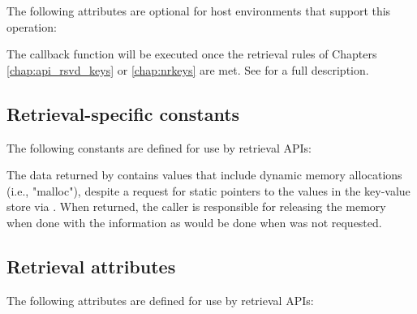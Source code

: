 
\reqattrend

\optattrstart
The following attributes are optional for host environments that support this operation:


\optattrend

\descr

The callback function will be executed once the retrieval rules of Chapters \ref{chap:api_rsvd_keys} or \ref{chap:nrkeys} are met.
See  for a full description.


\subsection{Retrieval-specific constants}

The following constants are defined for use by retrieval \acp{API}:

\begin{constantdesc}
%
The data returned by  contains values that include dynamic memory allocations (i.e., "malloc"), despite a request for static pointers to the values in the key-value store via .  When returned, the caller is responsible for releasing the memory when done with the information as would be done when  was not requested.
%
\end{constantdesc}


\subsection{Retrieval attributes}
\label{chap:api_kg:attr}

The following attributes are defined for use by retrieval \acp{API}:

